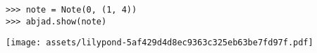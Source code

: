 \begin{comment}
<abjad>
note = Note(0, (1, 4))
abjad.show(note)
</abjad>
\end{comment}

\begin{lstlisting}
>>> note = Note(0, (1, 4))
>>> abjad.show(note)
\end{lstlisting}
\noindent\texttt{[image: assets/lilypond-5af429d4d8ec9363c325eb63be7fd97f.pdf]}
